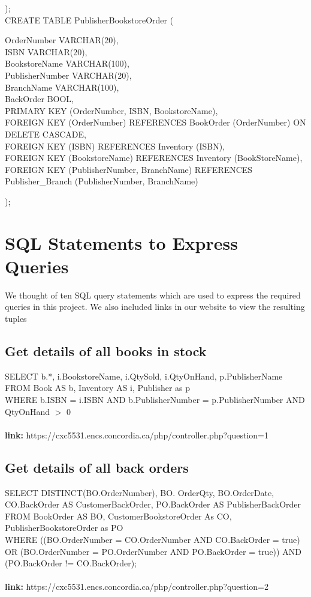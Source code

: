 \documentclass{scrreprt}
\begin{document}
);\\
CREATE TABLE PublisherBookstoreOrder
(
\begin{adjustwidth}{1cm}{0cm}
    OrderNumber     VARCHAR(20),\\
    ISBN            VARCHAR(20),\\
    BookstoreName   VARCHAR(100),\\
    PublisherNumber VARCHAR(20),\\
    BranchName      VARCHAR(100),\\
    BackOrder       BOOL,\\
    PRIMARY KEY (OrderNumber, ISBN, BookstoreName),\\
    FOREIGN KEY (OrderNumber) REFERENCES BookOrder (OrderNumber) ON DELETE CASCADE,\\
    FOREIGN KEY (ISBN) REFERENCES Inventory (ISBN),\\
    FOREIGN KEY (BookstoreName) REFERENCES Inventory (BookStoreName),\\
    FOREIGN KEY (PublisherNumber, BranchName) REFERENCES Publisher_Branch (PublisherNumber, BranchName)
\end{adjustwidth}
);

\chapter{SQL Statements to Express Queries}
We thought of ten SQL query statements which are used to express the required queries in this project. We also included links in our website to view the resulting tuples
\section{Get details of all books in stock}
 SELECT b.*, i.BookstoreName, i.QtySold, i.QtyOnHand, p.PublisherName \\
 	FROM Book AS b, Inventory AS i, Publisher as p\\
	 WHERE b.ISBN = i.ISBN AND b.PublisherNumber = p.PublisherNumber AND QtyOnHand $>$ 0
\\\\\textbf{link:} https://cxc5531.encs.concordia.ca/php/controller.php?question=1
\section{Get details of all back orders}
SELECT DISTINCT(BO.OrderNumber), BO. OrderQty, BO.OrderDate, CO.BackOrder AS CustomerBackOrder, PO.BackOrder AS PublisherBackOrder\\
	FROM BookOrder AS BO, CustomerBookstoreOrder As CO, PublisherBookstoreOrder as PO\\
	WHERE ((BO.OrderNumber = CO.OrderNumber AND CO.BackOrder = true) OR (BO.OrderNumber = PO.OrderNumber AND PO.BackOrder = true))
	AND (PO.BackOrder != CO.BackOrder);  
\\\\\textbf{link:} https://cxc5531.encs.concordia.ca/php/controller.php?question=2
\end{document}
